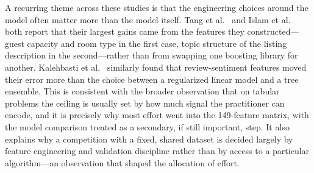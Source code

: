 \documentclass[journal]{IEEEtran}
\begin{document}
A recurring theme across these studies is that the engineering choices around the
model often matter more than the model itself. Tang et al.\ \cite{tang2024} and
Islam et al.\ \cite{islam2022} both report that their largest gains came from the
features they constructed---guest capacity and room type in the first case, topic
structure of the listing description in the second---rather than from swapping one
boosting library for another. Kalehbasti et al.\ \cite{kalehbasti2019} similarly
found that review-sentiment features moved their error more than the choice
between a regularized linear model and a tree ensemble. This is consistent with
the broader observation that on tabular problems the ceiling is usually set by how
much signal the practitioner can encode, and it is precisely why most effort
went into the 149-feature matrix, with the model comparison treated as a
secondary, if still important, step. It also explains why a competition with a
fixed, shared dataset is decided largely by feature engineering and validation
discipline rather than by access to a particular algorithm---an observation that
shaped the allocation of effort.
\end{document}

